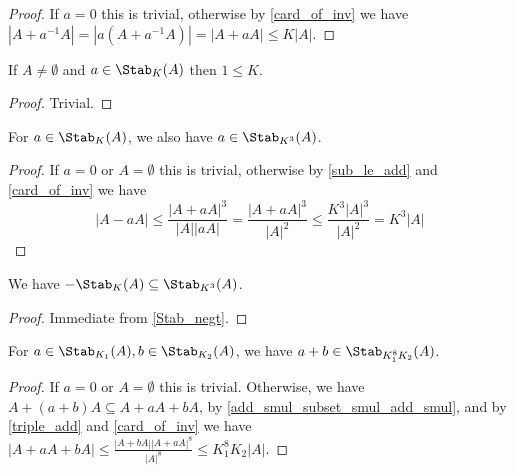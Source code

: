 \begin{proof}
    \leanok
    If $a = 0$ this is trivial, otherwise by \ref{card_of_inv} we have $|A + a^{-1}A| = |a(A + a^{-1}A)| = |A + a A| \leq K |A|$.
\end{proof}

\begin{lemma}
    \label{one_le_of_mem}
    \leanok
    If $A \neq \emptyset$ and $a \in \Stab_K(A)$ then $1 \leq K$.
\end{lemma}

\begin{proof}
    \leanok
    Trivial.
\end{proof}

\begin{lemma}
    \label{Stab_negt}
    \leanok
    For $a \in \Stab_K(A)$, we also have $a \in \Stab_{K^3}(A)$.
\end{lemma}

\begin{proof}
    \leanok
    If $a = 0$ or $A = \emptyset$ this is trivial, otherwise by \ref{sub_le_add} and \ref{card_of_inv} we have
    $$|A - a A| \leq \frac{|A + aA|^3}{|A| |a A|} = \frac{|A + aA|^3}{|A|^2} \leq \frac{K^3 |A|^3}{|A|^2} = K^3 |A|$$
\end{proof}

\begin{lemma}
    \label{Stab_neg}
    \leanok
    We have $-\Stab_{K}(A) \subseteq \Stab_{K^3}(A)$.
\end{lemma}

\begin{proof}
    \leanok
    Immediate from \ref{Stab_negt}.
\end{proof}

\begin{lemma}
    \label{Stab_addt}
    \leanok
    For $a \in \Stab_{K_1}(A), b \in \Stab_{K_2}(A)$, we have $a+b \in \Stab_{K_1^8 K_2}(A)$.
\end{lemma}

\begin{proof}
    \leanok
    If $a = 0$ or $A = \emptyset$ this is trivial. Otherwise, we have $A + (a+b) A \subseteq A + a A + b A$, by \ref{add_smul_subset_smul_add_smul},
    and by \ref{triple_add} and \ref{card_of_inv} we have $|A + a A + b A| \leq \frac{|A + bA| |A + aA|^8} {|A|^8} \leq K_1^8 K_2 |A|$.
\end{proof}

